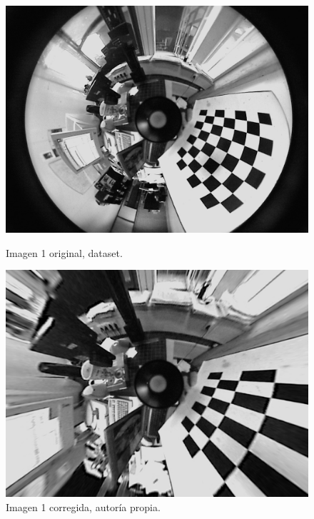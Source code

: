 \documentclass[a4paper,12pt]{article}
\begin{document}
{\begin{figure}[h!]
    \centering
    \begin{minipage}[b]{0.45\textwidth}
        \centering
        \includegraphics[width=\textwidth]{fonts/VMRImage0.jpg}
        \caption{Imagen 1 original, dataset.}
        \label{fig:izquierda1}
    \end{minipage}
    \hfill
    \begin{minipage}[b]{0.45\textwidth}
        \centering
        \includegraphics[width=\textwidth]{fonts/fisheye_0.jpg}
        \caption{Imagen 1 corregida, autoría propia.}
        \label{fig:derecha1}
    \end{minipage}
    
    \vspace{1cm} 


\end{figure}}
\end{document}
